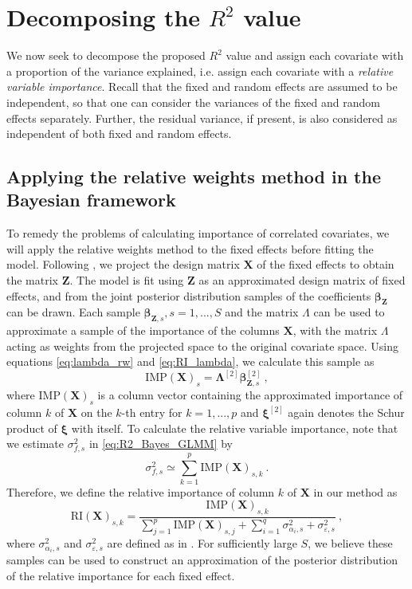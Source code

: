     
    


\section{Decomposing the \texorpdfstring{$R^2$}{Lg} value}
\label{sec:decomp_R2}
We now seek to decompose the proposed $R^2$ value and assign each covariate with a proportion of the variance explained, i.e. assign each covariate with a \textit{relative variable importance}. Recall that the fixed and random effects are assumed to be independent, so that one can consider the variances of the fixed and random effects separately. Further, the residual variance, if present, is also considered as independent of both fixed and random effects. 
\subsection{Applying the relative weights method in the Bayesian framework}
To remedy the problems of calculating importance of correlated covariates, we will apply the relative weights method to the fixed effects before fitting the model. Following , we project the design matrix $\mathbf{X}$ of the fixed effects to obtain the matrix $\mathbf{Z}$. The model is fit using $\mathbf{Z}$ as an approximated design matrix of fixed effects, and from the joint posterior distribution samples of the coefficients $\boldsymbol{\beta}_{\mathbf{Z}}$ can be drawn. Each sample $\boldsymbol{\beta}_{\mathbf{Z}, s}, s=1, ..., S$ and the matrix $\Lambda$ can be used to approximate a sample of the importance of the columns $\mathbf{X}$, with the matrix $\Lambda$ acting as weights from the projected space to the original covariate space. Using equations \eqref{eq:lambda_rw} and \eqref{eq:RI_lambda}, we calculate this sample as
\begin{equation}
    \text{IMP}(\mathbf{X})_s = \boldsymbol{\Lambda}^{[2]} \boldsymbol{\beta}_{\mathbf{Z}, s}^{[2]} \ ,
\end{equation}
where $\text{IMP}(\mathbf{X})_s$ is a column vector containing the approximated importance of column $k$ of $\mathbf{X}$ on the $k$-th entry for $k=1, ..., p$ and $\boldsymbol{\xi}^{[2]}$ again denotes the Schur product of $\boldsymbol{\xi}$ with itself. To calculate the relative variable importance, note that we estimate $\sigma^2_{f, s}$ in \eqref{eq:R2_Bayes_GLMM} by
\begin{equation}
    \sigma^2_{f, s} \simeq \sum_{k=1}^{p}\text{IMP}(\mathbf{X})_{s, k}  \ . 
\end{equation}
Therefore, we define the relative importance of column $k$ of $\mathbf{X}$ in our method as
\begin{equation}
    \label{eq:RI_X}
    \text{RI}(\mathbf{X})_{s, k} = \frac{\text{IMP}(\mathbf{X})_{s, k}}{\sum_{j=1}^{p}\text{IMP}(\mathbf{X})_{s, j} + \sum_{i=1}^q \sigma_{\alpha_i, s}^2 + \sigma_{\varepsilon, s}^2} \ ,
\end{equation}
where $\sigma_{\alpha_i, s}^2$ and  $\sigma_{\varepsilon, s}^2$ are defined as in .
For sufficiently large $S$, we believe these samples can be used to construct an approximation of the posterior distribution of the relative importance for each fixed effect. 

